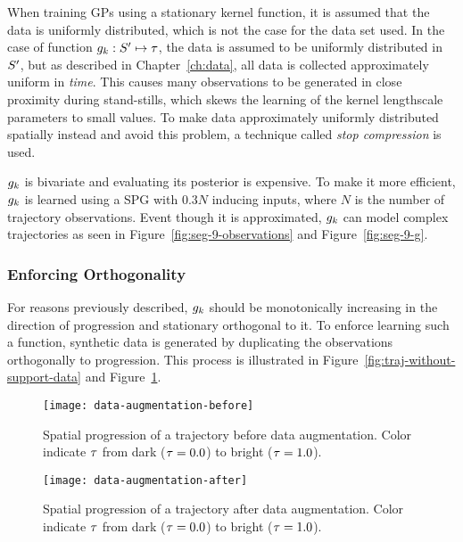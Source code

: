 When training GPs using a stationary kernel function, it is assumed
that the data is uniformly distributed, which is not the case for the
data set used. In the case of function $g_{k} : S' \mapsto
\tau$, the data is assumed to be uniformly
distributed in $S'$, but as described in Chapter~\ref{ch:data},
all data is collected approximately uniform in \textit{time}. This causes many
observations to be generated in close proximity during stand-stills, which skews the
learning of the kernel lengthscale parameters to small values. To
make data approximately uniformly distributed spatially instead and 
avoid this problem, a technique called \textit{stop compression} is used.

$g_{k}$ is bivariate and evaluating its posterior is expensive. To make
it more efficient, $g_{k}$ is learned using a SPG with $0.3N$ inducing inputs, 
where $N$ is the number of trajectory observations. Event though it is
approximated, $g_{k}$ can model complex trajectories as seen in
Figure~\ref{fig:seg-9-observations} and Figure~\ref{fig:seg-9-g}.

\subsubsection{Enforcing Orthogonality}\label{sec:data-augmentation}
For reasons previously described, $g_{k}$ should be monotonically increasing in
the direction of progression and stationary orthogonal to it.
To enforce learning such a function, synthetic data is generated by 
duplicating the observations orthogonally to progression. This process is illustrated in
Figure~\ref{fig:traj-without-support-data} and Figure~\ref{fig:traj-with-support-data}. 
\begin{figure}
  \begin{minipage}{.46\textwidth}
    \texttt{[image: data-augmentation-before]}
    \caption{Spatial progression of a trajectory
      before data augmentation. Color indicate $\tau$ from
      dark ($\tau=0.0$) to bright ($\tau=1.0$).}\label{fig:traj-without-support-data}
  \end{minipage}
  \hspace{5pt}
  \begin{minipage}{.46\textwidth}
    \texttt{[image: data-augmentation-after]}
    \caption{Spatial progression of a trajectory
      after data augmentation. Color indicate $\tau$ from
      dark ($\tau=0.0$) to bright ($\tau=1.0$).}\label{fig:traj-with-support-data}
  \end{minipage}
\end{figure}

